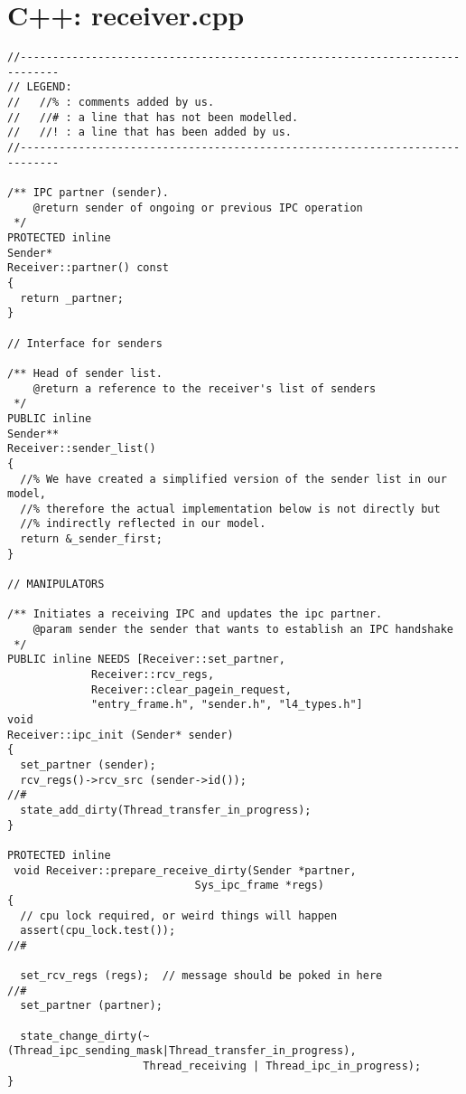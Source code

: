 \hypertarget{c++_receiver}{\chapter{C++: receiver.cpp}}
\lstset{language=C++}
\begin{lstlisting}
//----------------------------------------------------------------------------
// LEGEND:
//   //% : comments added by us.
//   //# : a line that has not been modelled.
//   //! : a line that has been added by us.
//----------------------------------------------------------------------------

/** IPC partner (sender).
    @return sender of ongoing or previous IPC operation
 */
PROTECTED inline
Sender*
Receiver::partner() const
{
  return _partner;
}

// Interface for senders

/** Head of sender list.
    @return a reference to the receiver's list of senders
 */
PUBLIC inline
Sender**
Receiver::sender_list()
{
  //% We have created a simplified version of the sender list in our model,
  //% therefore the actual implementation below is not directly but 
  //% indirectly reflected in our model.
  return &_sender_first;
}

// MANIPULATORS

/** Initiates a receiving IPC and updates the ipc partner.
    @param sender the sender that wants to establish an IPC handshake
 */
PUBLIC inline NEEDS [Receiver::set_partner, 
		     Receiver::rcv_regs, 
		     Receiver::clear_pagein_request,
		     "entry_frame.h", "sender.h", "l4_types.h"]
void
Receiver::ipc_init (Sender* sender)
{
  set_partner (sender);                                                    
  rcv_regs()->rcv_src (sender->id());                                      //#
  state_add_dirty(Thread_transfer_in_progress);
}

PROTECTED inline
 void Receiver::prepare_receive_dirty(Sender *partner,
                             Sys_ipc_frame *regs)
{
  // cpu lock required, or weird things will happen
  assert(cpu_lock.test());                                                 //#

  set_rcv_regs (regs);  // message should be poked in here                 //#
  set_partner (partner);                                                   

  state_change_dirty(~(Thread_ipc_sending_mask|Thread_transfer_in_progress),
                     Thread_receiving | Thread_ipc_in_progress);
}


\end{lstlisting}
